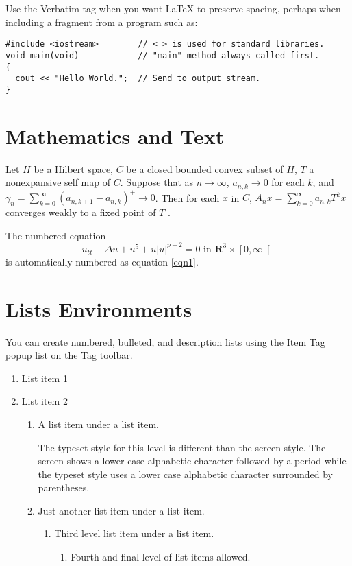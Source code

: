 \documentclass{book}%
\begin{document}
Use the Verbatim tag when you want \LaTeX{} to preserve spacing, perhaps when
including a fragment from a program such as:
\begin{verbatim}
#include <iostream>        // < > is used for standard libraries.
void main(void)            // "main" method always called first.
{
  cout << "Hello World.";  // Send to output stream.
}
\end{verbatim}

\section{Mathematics and Text}

Let $H$ be a Hilbert space, $C$ be a closed bounded convex subset of $H$, $T$
a nonexpansive self map of $C$. Suppose that as $n\rightarrow\infty$,
$a_{n,k}\rightarrow0$ for each $k$, and $\gamma_{n}=\sum_{k=0}^{\infty}\left(
a_{n,k+1}-a_{n,k}\right)  ^{+}\rightarrow0$. Then for each $x$ in $C$,
$A_{n}x=\sum_{k=0}^{\infty}a_{n,k}T^{k}x$ converges weakly to a fixed point of
$T$ .

The numbered equation
\begin{equation}
u_{tt}-\Delta u+u^{5}+u\left|  u\right|  ^{p-2}=0\text{ in }\mathbf{R}%
^{3}\times\left[  0,\infty\right[ \label{eqn1}%
\end{equation}
is automatically numbered as equation \ref{eqn1}.

\section{Lists Environments}

You can create numbered, bulleted, and description lists using the Item Tag
popup list on the Tag toolbar.

\begin{enumerate}
\item List item 1

\item List item 2

\begin{enumerate}
\item A list item under a list item.

The typeset style for this level is different than the screen style. The
screen shows a lower case alphabetic character followed by a period while the
typeset style uses a lower case alphabetic character surrounded by parentheses.

\item Just another list item under a list item.

\begin{enumerate}
\item Third level list item under a list item.

\begin{enumerate}
\item Fourth and final level of list items allowed.
\end{enumerate}
\end{enumerate}
\end{enumerate}
\end{enumerate}
\end{document}
